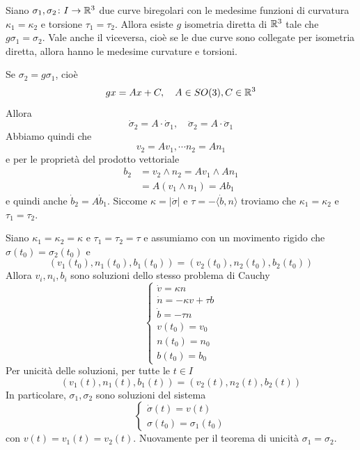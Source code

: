 \documentclass[a4paper]{article}
\begin{document}
\begin{snippettheorem}{}
    Siano \(\sigma_1, \sigma_2 \colon I \to \mathbb{R}^3\)
    due curve biregolari con le medesime funzioni di curvatura \(\kappa_1 = \kappa_2\) e torsione
    \(\tau_1 = \tau_2\).
    Allora esiste \(g\) isometria diretta di \(\mathbb{R}^3\)
    tale che \(g\sigma_1 = \sigma_2\).
    Vale anche il viceversa, cioè se le due curve sono collegate per isometria diretta, allora
    hanno le medesime curvature e torsioni.
\end{snippettheorem}

\begin{snippetproof}{}
    \begin{ffiproof}
        \item Se \(\sigma_2 = g \sigma_1\), cioè
        \[
            gx = Ax + C, \quad A \in SO(3), C \in \mathbb{R}^3
        \]
        Allora \[
            \dot\sigma_2 = A \cdot \dot \sigma_1, \quad \ddot \sigma_2 = A \cdot \ddot\sigma_1
        \]
        Abbiamo quindi che \[
            v_2 = Av_1, \cdots n_2 = An_1
        \]
        e per le proprietà del prodotto vettoriale
        \begin{align*}
            b_2 &= v_2 \wedge n_2 = Av_1 \wedge An_1 \\
            &= A(v_1 \wedge n_1) = Ab_1
        \end{align*}
        e quindi anche \(\dot b_2 = A\dot b_1\).
        Siccome \(\kappa = |\ddot \sigma|\) e \(\tau = -\langle \dot b,n\rangle\)
        troviamo che \(\kappa_1 = \kappa_2\) e \(\tau_1 = \tau_2\).
        \item Siano \(\kappa_1 = \kappa_2 = \kappa\) e
        \(\tau_1 = \tau_2 = \tau\) e assumiamo con un movimento rigido che
        \(\sigma(t_0) = \sigma_2(t_0)\) e \[
            (v_1(t_0), n_1(t_0), b_1(t_0)) = (v_2(t_0), n_2(t_0), b_2(t_0))
        \]
        Allora \(v_i, n_i, b_i\) sono soluzioni dello stesso problema di Cauchy
        \[
            \begin{cases}
                \dot v = \kappa n \\
                \dot n = -\kappa v + \tau b \\
                \dot b = - \tau n \\
                v(t_0) = v_0 \\
                n(t_0) = n_0 \\
                b(t_0) = b_0
            \end{cases}
        \]
        Per unicità delle soluzioni, per tutte le \(t \in I\)
        \[
            (v_1(t), n_1(t), b_1(t))
            = (v_2(t), n_2(t), b_2(t))
        \]
        In particolare, \(\sigma_1, \sigma_2\) sono soluzioni del sistema
        \[
            \begin{cases}
                \dot \sigma(t) = v(t) \\
                \sigma(t_0) = \sigma_1(t_0)
            \end{cases}
        \]
        con \(v(t) = v_1(t) = v_2(t)\).
        Nuovamente per il teorema di unicità
        \(\sigma_1 = \sigma_2\).
    \end{ffiproof}
\end{snippetproof}
\end{document}

